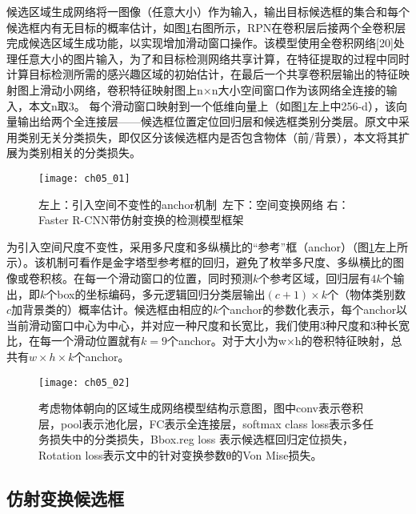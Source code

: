 候选区域生成网络将一图像（任意大小）作为输入，输出目标候选框的集合和每个候选框内有无目标的概率估计，如图\ref{fig:ch05_01}右图所示，RPN在卷积层后接两个全卷积层完成候选区域生成功能，以实现增加滑动窗口操作。该模型使用全卷积网络[20]处理任意大小的图片输入，为了和目标检测网络\citep{Girshick2015b}共享计算，在特征提取的过程中同时计算目标检测所需的感兴趣区域的初始估计，在最后一个共享卷积层输出的特征映射图上滑动小网络，卷积特征映射图上n×n大小空间窗口作为该网络全连接的输入，本文n取3。
每个滑动窗口映射到一个低维向量上（如图\ref{fig:ch05_01}左上中256-d），该向量输出给两个全连接层——候选框位置定位回归层和候选框类别分类层。原文中采用类别无关分类损失，即仅区分该候选框内是否包含物体（前/背景），本文将其扩展为类别相关的分类损失。
\begin{figure}[!htbp]
\centering
\texttt{[image: ch05\_01]}
\caption{左上：引入空间不变性的anchor机制\   左下：空间变换网络  右：Faster R-CNN带仿射变换的检测模型框架}
\label{fig:ch05_01}
\end{figure}

为引入空间尺度不变性，采用多尺度和多纵横比的“参考”框（anchor）（图\ref{fig:ch05_01}左上所示）。该机制可看作是金字塔型参考框的回归，避免了枚举多尺度、多纵横比的图像或卷积核。在每一个滑动窗口的位置，同时预测$k$个参考区域，回归层有$4k$个输出，即$k$个box的坐标编码，多元逻辑回归分类层输出$(c+1)×k$个（物体类别数$c$加背景类的）概率估计。候选框由相应的$k$个anchor的参数化表示，每个anchor以当前滑动窗口中心为中心，并对应一种尺度和长宽比，我们使用3种尺度和3种长宽比，在每一个滑动位置就有$k=9$个anchor。对于大小为w×h的卷积特征映射，总共有$w×h×k$个anchor。

\begin{figure}[!htbp]
\centering
\texttt{[image: ch05\_02]}
\caption{考虑物体朝向的区域生成网络模型结构示意图，图中conv表示卷积层，pool表示池化层，FC表示全连接层，softmax class loss表示多任务损失中的分类损失，Bbox.reg loss 表示候选框回归定位损失，Rotation loss表示文中的针对变换参数θ的Von Mise损失。}
\label{fig:ch05_02}
\end{figure} 

\subsection{仿射变换候选框}
 
